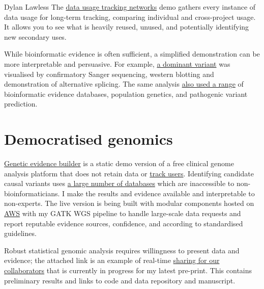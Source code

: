\documentclass[11pt,a4paper]{article}
\begin{document}
\begin{cv}{Dylan Lawless}
The \href{https://lawlessgenomics.com/data_usage_network}{data usage tracking networks} demo gathers every instance of data usage for long-term tracking, 
comparing individual and cross-project usage. It allows you to see what is heavily reused, unused, and potentially identifying new secondary uses.

While bioinformatic evidence is often sufficient, a simplified demonstration can be more interpretable and persuasive. For example, 
\href{https://lawlessgenomics.com/portfolio#A201}{a dominant variant}
was visualised by confirmatory Sanger sequencing, western blotting and demonstration of alternative splicing.
The same analysis 
\href{https://lawlessgenomics.com/portfolio#A202}{also used a range} 
of bioinformatic evidence databases, population genetics, and pathogenic variant prediction.

\section*{Democratised genomics}
\href{https://lawlessgenomics.com/topic/evidence_builder.html}{Genetic evidence builder} is a static demo version of a free clinical genome analysis platform that does not retain data or 
\href{https://themarkup.org/blacklight?url=lawlessgenomics.com}{track users}. 
Identifying candidate causal variants uses 
\href{https://lawlessgenomics.com/topic/evidence-finder-gene}{
a large number of databases} which are inaccessible to non-bioinformaticians.
I make the results and evidence available and interpretable to non-experts.
The live version is being built with modular components hosted on
\href{https://evidencetable.s3.eu-central-1.amazonaws.com/clingen-gene_disease_validity_table_original.html}{AWS} 
with my GATK WGS pipeline to handle large-scale data requests and report reputable evidence sources, confidence, and according to standardised guidelines. 

Robust statistical genomic analysis requires willingness to present data and evidence; the attached link is an example of real-time \href{https://lawlessgenomics.com/rsv2021lawless.github.io/}{sharing for our collaborators} that is currently in progress for my latest pre-print. This contains preliminary results and links to code and data repository and manuscript.


\end{cv}
\end{document}
